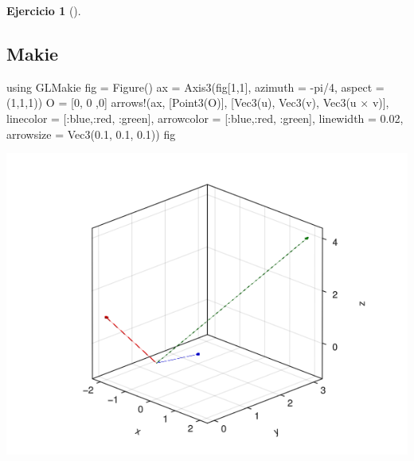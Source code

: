 \documentclass[
  a4paper,
]{scrreport}
\newenvironment{Shaded}{\begin{snugshade}}{\end{snugshade}}
\newcommand{\BuiltInTok}[1]{\textcolor[rgb]{0.00,0.23,0.31}{#1}}
\newcommand{\ConstantTok}[1]{\textcolor[rgb]{0.56,0.35,0.01}{#1}}
\newcommand{\FloatTok}[1]{\textcolor[rgb]{0.68,0.00,0.00}{#1}}
\newcommand{\FunctionTok}[1]{\textcolor[rgb]{0.28,0.35,0.67}{#1}}
\newcommand{\ImportTok}[1]{\textcolor[rgb]{0.00,0.46,0.62}{#1}}
\newcommand{\NormalTok}[1]{\textcolor[rgb]{0.00,0.23,0.31}{#1}}
\newcommand{\OperatorTok}[1]{\textcolor[rgb]{0.37,0.37,0.37}{#1}}
\theoremstyle{definition}
\newtheorem{exercise}{Ejercicio}[chapter]
\theoremstyle{remark}
\begin{document}
\begin{exercise}[]
\begin{enumerate}
\begin{tcolorbox}
  \section{Makie}

\begin{Shaded}
\begin{Highlighting}[]
\ImportTok{using} \BuiltInTok{GLMakie}
\NormalTok{fig }\OperatorTok{=} \FunctionTok{Figure}\NormalTok{()}
\NormalTok{ax }\OperatorTok{=} \FunctionTok{Axis3}\NormalTok{(fig[}\FloatTok{1}\NormalTok{,}\FloatTok{1}\NormalTok{], azimuth }\OperatorTok{=} \OperatorTok{{-}}\ConstantTok{pi}\OperatorTok{/}\FloatTok{4}\NormalTok{, aspect }\OperatorTok{=}\NormalTok{ (}\FloatTok{1}\NormalTok{,}\FloatTok{1}\NormalTok{,}\FloatTok{1}\NormalTok{))}
\NormalTok{O }\OperatorTok{=}\NormalTok{ [}\FloatTok{0}\NormalTok{, }\FloatTok{0}\NormalTok{ ,}\FloatTok{0}\NormalTok{]}
\FunctionTok{arrows!}\NormalTok{(ax, [}\FunctionTok{Point3}\NormalTok{(O)], [}\FunctionTok{Vec3}\NormalTok{(u), }\FunctionTok{Vec3}\NormalTok{(v), }\FunctionTok{Vec3}\NormalTok{(u }\OperatorTok{×}\NormalTok{ v)], }
\NormalTok{    linecolor }\OperatorTok{=}\NormalTok{ [}\OperatorTok{:}\NormalTok{blue,}\OperatorTok{:}\NormalTok{red, }\OperatorTok{:}\NormalTok{green], arrowcolor }\OperatorTok{=}\NormalTok{ [}\OperatorTok{:}\NormalTok{blue,}\OperatorTok{:}\NormalTok{red, }\OperatorTok{:}\NormalTok{green],}
\NormalTok{    linewidth }\OperatorTok{=} \FloatTok{0.02}\NormalTok{, arrowsize }\OperatorTok{=} \FunctionTok{Vec3}\NormalTok{(}\FloatTok{0.1}\NormalTok{, }\FloatTok{0.1}\NormalTok{, }\FloatTok{0.1}\NormalTok{))}
\NormalTok{fig}
\end{Highlighting}
\end{Shaded}

  \includegraphics{08-funciones-vectoriales_files/figure-pdf/cell-8-output-1.png}

  \end{tcolorbox}
\end{enumerate}

\end{exercise}
\end{document}

